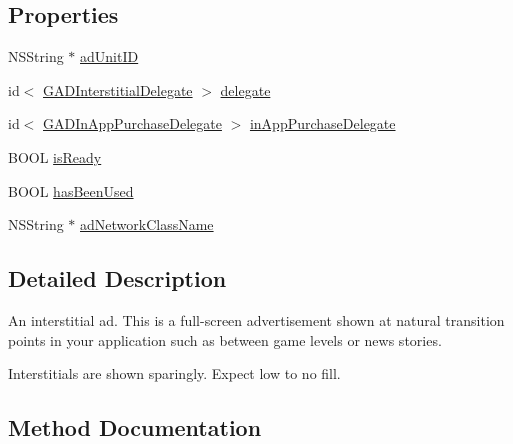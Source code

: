 \subsection*{Properties}
\begin{DoxyCompactItemize}
\item 
N\+S\+String $\ast$ \hyperlink{interfaceGADInterstitial_a73457abf83692509057ec285b4315836}{ad\+Unit\+ID}
\item 
id$<$ \hyperlink{protocolGADInterstitialDelegate-p}{G\+A\+D\+Interstitial\+Delegate} $>$ \hyperlink{interfaceGADInterstitial_a174dfe74aa49a50ad6e8855d20c657d0}{delegate}
\item 
id$<$ \hyperlink{protocolGADInAppPurchaseDelegate-p}{G\+A\+D\+In\+App\+Purchase\+Delegate} $>$ \hyperlink{interfaceGADInterstitial_ae0e33ef86c5ce259e026b8d523180543}{in\+App\+Purchase\+Delegate}
\item 
B\+O\+OL \hyperlink{interfaceGADInterstitial_a12198fa14bc46f0a52b903ba7b0a2de0}{is\+Ready}
\item 
B\+O\+OL \hyperlink{interfaceGADInterstitial_af862278c65bd83cb6a0e4db168fac029}{has\+Been\+Used}
\item 
N\+S\+String $\ast$ \hyperlink{interfaceGADInterstitial_a15863b00745b472e5683e50a97268431}{ad\+Network\+Class\+Name}
\end{DoxyCompactItemize}


\subsection{Detailed Description}
An interstitial ad. This is a full-\/screen advertisement shown at natural transition points in your application such as between game levels or news stories.

Interstitials are shown sparingly. Expect low to no fill. 

\subsection{Method Documentation}
\mbox{\label{interfaceGADInterstitial_aa8232e1a7be46e42c6eac9e164636a9b}} 
